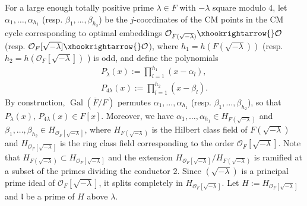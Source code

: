 \documentclass{amsart}
\numberwithin{equation}{subsection}
\numberwithin{theorem}{section}
\theoremstyle{definition}
\theoremstyle{remark}
\newcommand{\cO}{\mathcal{O}}
\DeclareMathOperator{\Gal}{Gal}
\begin{document}
For a large enough totally positive prime $\lambda\in F$ with $-\lambda$ square modulo $4$, let $\alpha_{1}, \dotsc, \alpha_{h_1}$ (resp. $\beta_{1}, \dotsc, \beta_{h_2}$) be the $j$-coordinates of the CM points in the CM cycle corresponding to optimal embeddings $\mathcal{O}_{F(\sqrt{-\lambda})} \xhookrightarrow{} \mathcal{O}$  (resp. $\mathcal{O}_F[\sqrt{-\lambda}] \xhookrightarrow{} \mathcal{O}$), where $h_1 = h(F(\sqrt{-\lambda}))$ (resp. $h_2 = h(\cO_F[\sqrt{-\lambda}])$ ) is odd, and define the polynomials \begin{align*}
    P_{\lambda}(x) := \prod_{l=1}^{h_1}(x-\alpha_l), \\
    P_{4\lambda}(x) := \prod_{l=1}^{h_2}(x-\beta_l).
\end{align*} By construction, $\Gal(\overline{F}/F)$ permutes $\alpha_{1}, \dotsc, \alpha_{h_1}$ (resp. $\beta_{1}, \dotsc, \beta_{h_2}$), 
so that $P_{\lambda}(x), \, P_{4\lambda}(x)\in F[x]$. Moreover, we have $\alpha_1, \dotsc, \alpha_{h_1} \in H_{F(\sqrt{-\lambda})}$ and  $\beta_1, \dotsc, \beta_{h_2} \in H_{\mathcal{O}_F[\sqrt{-\lambda}]}$, where  $H_{F(\sqrt{-\lambda})}$ is the  Hilbert class field of $F(\sqrt{-\lambda})$ and  $H_{\mathcal{O}_F[\sqrt{-\lambda}]}$ is  the ring class field  corresponding to the order $\mathcal{O}_F[\sqrt{-\lambda}]$. Note that $H_{F(\sqrt{-\lambda})} \subset H_{\mathcal{O}_F[\sqrt{-\lambda}]}$ and the extension $H_{\mathcal{O}_F[\sqrt{-\lambda}]} / H_{F(\sqrt{-\lambda})}$ is ramified at a subset of the primes dividing the conductor $2$. Since $(\sqrt{-\lambda})$ is a principal prime ideal of $\mathcal{O}_F[\sqrt{-\lambda}]$, it splits completely in $H_{\mathcal{O}_F[\sqrt{-\lambda}]}$. Let $H := H_{\mathcal{O}_F[\sqrt{-\lambda}]}$ and  $\mathfrak{l}$ be a prime of $H$ above $\lambda$. 
\end{document}
